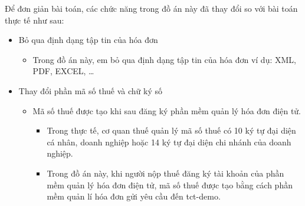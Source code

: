 Để đơn giản   bài toán, các chức năng trong đồ án này đã thay đổi so với bài toán thực tế như sau:

\begin{itemize}

    \item Bỏ qua định dạng tập tin của hóa đơn

          \begin{itemize}

              \item Trong đồ án này, em bỏ qua định dạng tập tin của hóa đơn ví dụ: XML, PDF, EXCEL, \dots

          \end{itemize}

    \item Thay đổi phần mã số thuế và chữ ký số

          \begin{itemize}

              \item Mã số thuế được tạo khi sau đăng ký phần mềm quản lý hóa đơn điện tử.

                    \begin{itemize}

                        \item Trong thực tế, cơ quan thuế quản lý mã số thuế có 10 ký tự đại diện cá nhân, doanh nghiệp hoặc 14 ký tự đại diện chi nhánh của doanh nghiệp. 





                        \item Trong đồ án này, khi người nộp thuế đăng ký tài khoản của phần mềm quản lý hóa đơn điện tử, mã số thuế được tạo bằng cách phần mềm quản lí hóa đơn gửi yêu cầu đến tct-demo.


\end{itemize}
\end{itemize}
\end{itemize}
